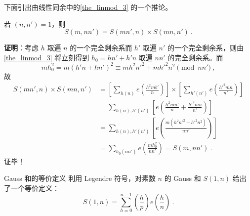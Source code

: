 下面引出由线性同余中的\autoref{the_linmod_3} 的一个推论。
\begin{corollary}{}
若 $(n, n') = 1$，则
\begin{equation}
S(m, nn') = S(mn', n) \times S(mn, n') ~.
\end{equation}

\end{corollary}
\textbf{证明}：考虑 $h$ 取遍 $n$ 的一个完全剩余系而 $h'$ 取遍 $n'$ 的一个完全剩余系，则由\autoref{the_linmod_3} 将立刻得到 $h_0 = hn' +h'n$ 取遍 $nn'$ 的完全剩余系。而
\begin{equation}
mh_0^2 = m(h'n + hn')^2 \equiv mh^2n'^2 + mh'^2n^2 \pmod{nn'} ~,
\end{equation}
故
\begin{equation}
\begin{aligned}
S(mn', n) \times S(mn, n') &= \left[ \sum_{h(n)} e\left(\frac{h^2mb'}{n}\right) \right] \times \left[\sum_{h'(n')} e\left(\frac{h'^2mn}{n'}\right)\right] \\
&= \sum_{h(n), h'(n')} \left[ e\left(\frac{h^2 mn'}{n} + \frac{h'^2 mn}{n'}\right)\right] \\
&= \sum_{h(n), h'(n')} \left[ e\left( \frac{m(h^2 n'^2 + h'^2 n^2)}{nn'} \right)\right]\\
&= \sum_{h_0(nn')} e\left( \frac{m h_0^2}{nn'} \right) = S(m, nn')~.
\end{aligned}
\end{equation}
证毕！

\begin{theorem}{Gauss 和的等价定义}
利用 Legendre 符号，对素数 $n$ 的 Gauss 和 $S(1, n)$ 给出了一个等价定义：
\begin{equation}
S(1, n) = \sum_{h=0}^{n-1} \left(\frac hp\right) e\left(\frac{h}{n}\right) ~.
\end{equation}

\end{theorem}